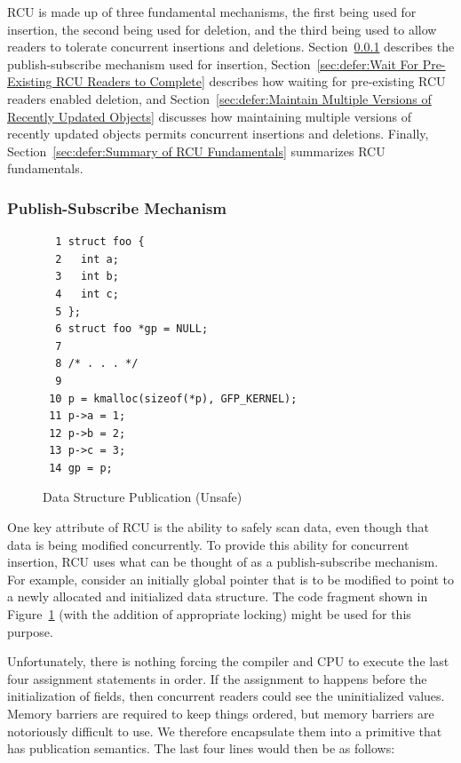 RCU is made up of three fundamental mechanisms, the first being
used for insertion, the second being used for deletion, and the third
being used to allow readers to tolerate concurrent insertions and deletions.
Section~\ref{sec:defer:Publish-Subscribe Mechanism}
describes the publish-subscribe mechanism used for insertion,
Section~\ref{sec:defer:Wait For Pre-Existing RCU Readers to Complete}
describes how waiting for pre-existing RCU readers enabled deletion,
and
Section~\ref{sec:defer:Maintain Multiple Versions of Recently Updated Objects}
discusses how maintaining multiple versions of recently updated objects
permits concurrent insertions and deletions.
Finally,
Section~\ref{sec:defer:Summary of RCU Fundamentals}
summarizes RCU fundamentals.

\subsubsection{Publish-Subscribe Mechanism}
\label{sec:defer:Publish-Subscribe Mechanism}

\begin{figure}[tbp]
{ \scriptsize
\begin{verbatim}
  1 struct foo {
  2   int a;
  3   int b;
  4   int c;
  5 };
  6 struct foo *gp = NULL;
  7
  8 /* . . . */
  9
 10 p = kmalloc(sizeof(*p), GFP_KERNEL);
 11 p->a = 1;
 12 p->b = 2;
 13 p->c = 3;
 14 gp = p;
\end{verbatim}
}
\caption{Data Structure Publication (Unsafe)}
\label{fig:defer:Data Structure Publication (Unsafe)}
\end{figure}

One key attribute of RCU is the ability to safely scan data, even
though that data is being modified concurrently.
To provide this ability for concurrent insertion,
RCU uses what can be thought of as a publish-subscribe mechanism.
For example, consider an initially  global pointer
 that is to be modified to point to a newly allocated
and initialized data structure.
The code fragment shown in
Figure~\ref{fig:defer:Data Structure Publication (Unsafe)}
(with the addition of appropriate locking)
might be used for this purpose.

Unfortunately, there is nothing forcing the compiler and CPU to execute
the last four assignment statements in order.
If the assignment to  happens before the initialization
of  fields, then concurrent readers could see the
uninitialized values.
Memory barriers are required to keep things ordered, but memory barriers
are notoriously difficult to use.
We therefore encapsulate them into a primitive
 that has publication semantics.
The last four lines would then be as follows:

